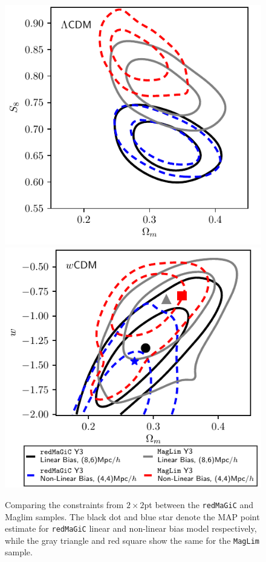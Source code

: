 \documentclass[aps, prd,twocolumn,superscriptaddress,nofootinbib,preprintnumbers]{revtex4-1}
\newcommand{\redmagic}{\texttt{redMaGiC} }
\newcommand{\maglim}{\texttt{MagLim} }
\begin{document}
\begin{figure}
\includegraphics[width=\columnwidth]{figs/compare_maglim_rm_lcdm.pdf}
\includegraphics[width=\columnwidth]{figs/compare_maglim_rm_wcdm.pdf}
\caption[]{Comparing the constraints from $2\times2$pt between the \redmagic and Maglim samples. The black dot and blue star denote the MAP point estimate for \redmagic linear and non-linear bias model respectively, while the gray triangle and red square show the same for the \maglim sample.  }\label{fig:maglim_comp}
\end{figure}
\end{document}

